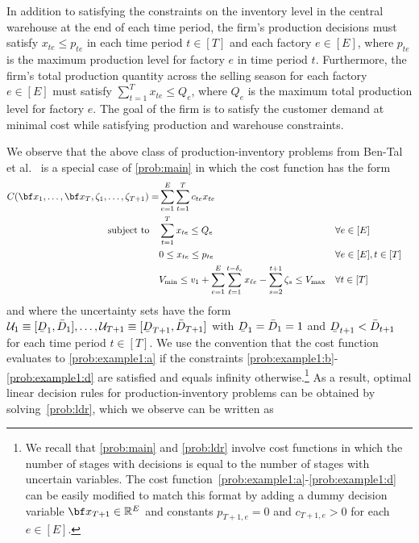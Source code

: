 \documentclass[nonblindrev,mnsc]{informs3} %
\newcommand{\bx}{{\bf x}}
\def\Real{\mathbb{R}}
\let\R\Real
\newcommand{\ubar}[1]{\text{\b{$#1$}}}
\begin{document}
   In addition to satisfying the constraints on the inventory level in the central warehouse at the end of each time period, the firm's production decisions must satisfy $x_{te} \le p_{te}$ in each time period $t \in [T]$ and each factory $e \in [E]$, where $p_{te}$ is the maximum production level for factory $e$ in time period $t$. Furthermore, the firm's total production quantity across the selling season for each factory $e \in [E]$ must satisfy $\sum_{t=1}^T x_{te}  \le Q_e$, where $Q_e$ is the maximum total production level for factory $e$. 
The goal of the firm is to satisfy the customer demand at minimal cost while satisfying production and warehouse constraints. 


We observe that the above class of production-inventory problems from Ben-Tal et al.~\cite{ben2004adjustable} is a special case of \eqref{prob:main} in which the cost function has the form  
\begin{subequations}
\begin{align} 
C(\bx_1,\ldots,\bx_T, \zeta_1,\ldots,\zeta_{T+1}) =  &  \sum_{e=1}^E \sum_{t=1}^{T}  c_{te} x_{te}\label{prob:example1:a} \\
\textnormal{subject to}\quad &\sum_{t=1}^{T} x_{te} \le  Q_e &&  \forall e  \in [E]  \label{prob:example1:b}\\
&0 \le x_{te} \le  p_{te} && \forall  e \in [E],  t \in [T] \label{prob:example1:c}\\
&V_{\textnormal{min}} \le v_1 + \sum_{e=1}^E \sum_{\ell=1}^{t-\delta_e}   x_{\ell e} - \sum_{s=2}^{t+1} \zeta_s \le  V_{\textnormal{max}} && \forall  t \in [T] \label{prob:example1:d}
\end{align}  
\end{subequations}%
and where the uncertainty sets have the form $\mathcal{U}_1 \equiv [\ubar{D}_1,\bar{D}_1], \ldots, \mathcal{U}_{T+1} \equiv [\ubar{D}_{T+1},\bar{D}_{T+1}]$ 
with $\ubar{D}_1 = \bar{D}_1 = 1$ and $\ubar{D}_{t+1} < \bar{D}_{t+1}$ for each time period $t \in [T]$. 
We use the convention that the cost function evaluates to \eqref{prob:example1:a} if the constraints \eqref{prob:example1:b}-\eqref{prob:example1:d} are satisfied and equals infinity otherwise.\footnote{We recall that \eqref{prob:main} and \eqref{prob:ldr} involve cost functions in which the number of stages with decisions is equal to the number of stages with uncertain variables. The cost function~\eqref{prob:example1:a}-\eqref{prob:example1:d} can be easily modified to match this format  by adding a dummy decision variable $\bx_{T+1} \in \R^E$ and constants $p_{T+1,e} =0$ and $ c_{T+1,e} > 0$ for each $e \in [E]$.} As a result, optimal linear decision rules for production-inventory problems can be obtained by solving~\eqref{prob:ldr}, which we observe can be written as
\end{document}
